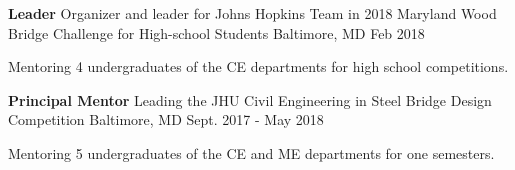 \begin{cventries}
{     }
     \vspace{8pt}
  \cventry
    {\textbf{Leader}} %
    {Organizer and leader for Johns Hopkins Team in 2018 Maryland Wood Bridge Challenge for High-school Students} %
    {Baltimore, MD} %
    {Feb 2018} %
    {
      \begin{cvitems} %
        \item {Mentoring 4 undergraduates of the CE departments for high school competitions.}
      \end{cvitems}
    }
       \vspace{5pt}
  \cventry
    {\textbf{Principal Mentor}} %
    {Leading the JHU Civil Engineering in Steel Bridge Design Competition} %
    {Baltimore, MD} %
    {Sept. 2017 - May 2018} %
    {
      \begin{cvitems} %
        \item {Mentoring 5 undergraduates of the CE and ME departments for one semesters.}
             \end{cvitems}
    }


\end{cventries}
